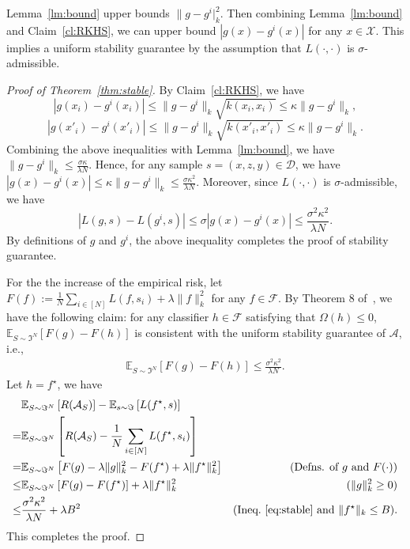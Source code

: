 \documentclass[11pt]{article}
\newcommand{\Exp}{\mathbb{E}}
\newcommand{\calA}{\mathcal{A}}
\newcommand{\calD}{\mathcal{D}}
\newcommand{\calF}{\mathcal{F}}
\newcommand{\calX}{\mathcal{X}}
\begin{document}
	\noindent
	Lemma~\ref{lm:bound} upper bounds $\|g-g^i|_k^2$.
	Then combining Lemma~\ref{lm:bound} and Claim~\ref{cl:RKHS}, we can upper bound $|g(x)-g^i(x)|$ for any $x\in \calX$. 
	This implies a uniform stability guarantee by the assumption that $L(\cdot,\cdot)$ is $\sigma$-admissible.
	\begin{proof}[Proof of Theorem~\ref{thm:stable}]
		By Claim~\ref{cl:RKHS}, we have
		\[
		|g(x_i)-g^{i}(x_i)|\leq \|g-g^{i}\|_k \sqrt{k(x_i,x_i)}\leq \kappa \|g-g^{i}\|_k,
		\]
		\[
		|g(x'_i)-g^{i}(x'_i)|\leq \|g-g^{i}\|_k \sqrt{k(x'_i,x'_i)}\leq \kappa \|g-g^{i}\|_k.
		\]
		Combining the above inequalities with Lemma~\ref{lm:bound}, we have
		$\|g-g^{i}\|_k\leq \frac{\sigma \kappa}{\lambda N}$.
		Hence, for any sample $s=(x,z,y)\in \calD$, we have
		$
		|g(x)-g^{i}(x)|\leq \kappa \|g-g^{i}\|_k\leq \frac{\sigma \kappa^2}{\lambda N}.
		$
		Moreover, since $L(\cdot,\cdot)$ is $\sigma$-admissible, we have
		\[
		|L(g,s)-L(g^{i},s)|\leq \sigma |g(x)-g^{i}(x)|\leq \frac{\sigma^2 \kappa^2}{\lambda N}.
		\]
		By definitions of $g$ and $g^{i}$, the above inequality completes the proof of stability guarantee.
		
		For the the increase of the empirical risk, let $F(f):=\frac{1}{N} \sum_{i\in [N]} L(f,s_i) + \lambda \|f\|_k^2$ for any $f\in \calF$.
		By Theorem 8 of~\cite{shalev2010learnability}, we have the following claim: for any classifier $h\in \calF$ satisfying that $\Omega(h)\leq 0$, $\Exp_{S\sim \Im^N} \left[ F(g) - F(h) \right]$ is consistent with the uniform stability guarantee of $\calA$, i.e.,
		\begin{eqnarray}
		\label{eq:stable}
		\Exp_{S\sim \Im^N} \left[ F(g) - F(h) \right] \leq \frac{\sigma^2 \kappa^2}{\lambda N}.
		\end{eqnarray}
		Let $h=f^\star$, we have
		\begin{eqnarray*}
			\begin{split}
				&\Exp_{S\sim \Im^N} \left[R(\calA_S) \right] - \Exp_{s\sim \Im} \left[L(f^\star,s)\right] &\\
				= & \Exp_{S\sim \Im^N} \left[R(\calA_S) - \frac{1}{N} \sum_{i\in [N]} L(f^\star, s_i) \right] & \\
				= & \Exp_{S\sim \Im^N} \left[F(g)-\lambda\|g\|_k^2-F(f^\star)+ \lambda\|f^\star\|_k^2\right] 
				& (\text{Defns. of $g$ and $F(\cdot)$}) \\
				\leq &\Exp_{S\sim \Im^N} \left[F(g)-F(f^\star)\right] + \lambda\|f^\star\|_k^2 & (\|g\|_k^2\geq 0) \\
				\leq &\frac{\sigma^2 \kappa^2}{\lambda N} + \lambda B^2 & (\text{Ineq.~\eqref{eq:stable} and } \|f^\star\|_k\leq B).
			\end{split}
		\end{eqnarray*}
		This completes the proof.
	\end{proof}
	
\end{document}
